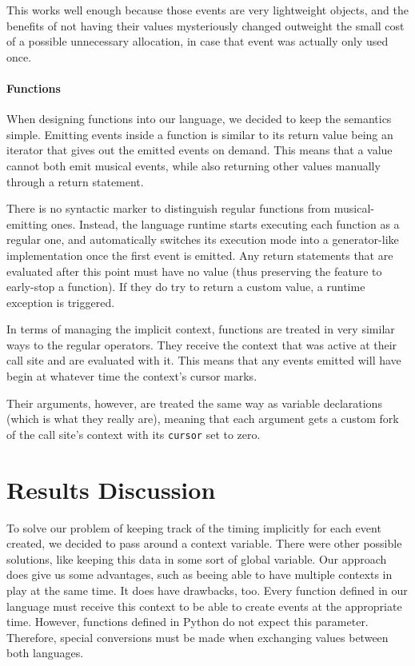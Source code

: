 \documentclass[a4paper,UKenglish,cleveref, autoref]{oasics-v2019}
\begin{document}
This works well enough because those events are very lightweight objects, and the benefits of not having their values mysteriously changed outweight the small cost of a possible unnecessary allocation, in case that event was actually only used once.

\paragraph*{Functions}
When designing functions into our language, we decided to keep the semantics simple. Emitting events inside a function is similar to its return value being an iterator that gives out the emitted events on demand. This means that a value cannot both emit musical events, while also returning other values manually through a return statement.

There is no syntactic marker to distinguish regular functions from musical-emitting ones. Instead, the language runtime starts executing each function as a regular one, and automatically switches its execution mode into a generator-like implementation once the first event is emitted. Any return statements that are evaluated after this point must have no value (thus preserving the feature to early-stop a function). If they do try to return a custom value, a runtime exception is triggered.

In terms of managing the implicit context, functions are treated in very similar ways to the regular operators. They receive the context that was active at their call site and are evaluated with it. This means that any events emitted will have begin at whatever time the context's cursor marks.

Their arguments, however, are treated the same way as variable declarations (which is what they really are), meaning that each argument gets a custom fork of the call site's context with its \texttt{cursor} set to zero.

\section{Results Discussion}
\label{sec:conclusions}

To solve our problem of keeping track of the timing implicitly for each event created, we decided to pass around a context variable. There were other possible solutions, like keeping this data in some sort of global variable. Our approach does give us some advantages, such as beeing able to have multiple contexts in play at the same time. It does have drawbacks, too. Every function defined in our language must receive this context to be able to create events at the appropriate time. However, functions defined in Python do not expect this parameter. Therefore, special conversions must be made when exchanging values between both languages.
\end{document}
